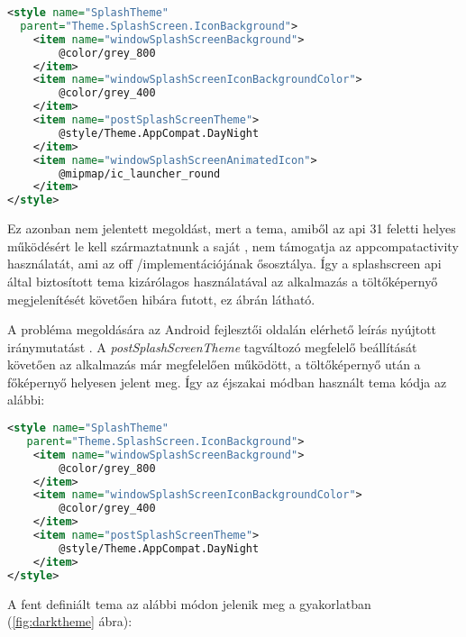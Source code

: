 \begin{lstlisting}[frame=single,language=xml,emph={style,item},
    emphstyle=\color{BurntOrange}\textbf,stringstyle=\color{OliveGreen}\textbf]
<style name="SplashTheme"
  parent="Theme.SplashScreen.IconBackground">
    <item name="windowSplashScreenBackground">
        @color/grey_800
    </item>
    <item name="windowSplashScreenIconBackgroundColor">
        @color/grey_400
    </item>
    <item name="postSplashScreenTheme">
        @style/Theme.AppCompat.DayNight
    </item>
    <item name="windowSplashScreenAnimatedIcon">
        @mipmap/ic_launcher_round
    </item>
</style>
\end{lstlisting}

Ez azonban nem jelentett megoldást, mert a \gls{tema}, amiből az \acrshort{api} 31 feletti helyes működésért
le kell származtatnunk a saját , nem támogatja az \gls{appcompat}\gls{activity} használatát, ami
az \acrlong{off} \-/implementációjának ősosztálya. Így a \gls{splashscreen} \acrshort{api} által biztosított
\gls{tema} kizárólagos használatával az alkalmazás a töltőképernyő megjelenítését követően hibára futott,
ez \az{\ref{fig:appcompatcrash}} ábrán látható.

A probléma megoldására az Android fejlesztői oldalán elérhető leírás
nyújtott iránymutatást \cite{splashscreenmigration}. A \textit{postSplashScreenTheme} tagváltozó megfelelő beállítását követően
az alkalmazás már megfelelően működött, a töltőképernyő után a főképernyő helyesen jelent meg.
Így az éjszakai módban használt \gls{tema} kódja az alábbi:

\begin{lstlisting}[frame=single,language=xml,emph={style,item},
    emphstyle=\color{BurntOrange}\textbf,stringstyle=\color{OliveGreen}\textbf]
 <style name="SplashTheme"
   parent="Theme.SplashScreen.IconBackground">
    <item name="windowSplashScreenBackground">
        @color/grey_800
    </item>
    <item name="windowSplashScreenIconBackgroundColor">
        @color/grey_400
    </item>
    <item name="postSplashScreenTheme">
        @style/Theme.AppCompat.DayNight
    </item>
</style>
\end{lstlisting}

A fent definiált \gls{tema} az alábbi módon jelenik meg a gyakorlatban (\ref{fig:darktheme} ábra):


